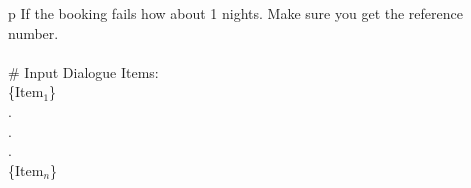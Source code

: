 \begin{table*}
\begin{tabular}{p\linewidth}
If the booking fails how about 1 nights. Make sure you get the reference number. \\
 \\
\# Input Dialogue Items: \\
\{Item$_1$\}\\
.\\
.\\
.\\
\{Item$_n$\}\\
\bottomrule
\end{tabular}
\end{table*}
